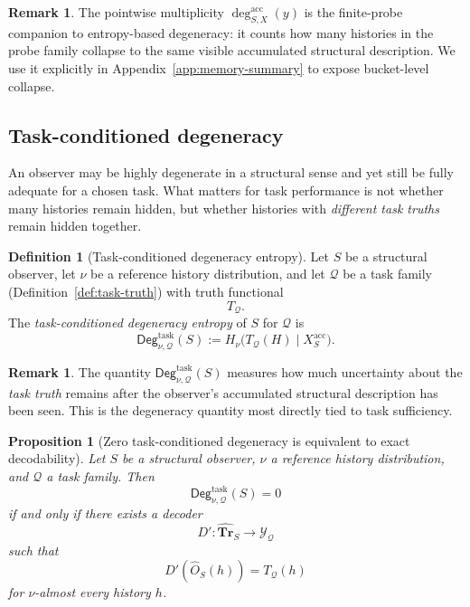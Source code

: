 \documentclass[11pt,twoside]{article}
\newtheorem{proposition}[theorem]{Proposition}
\theoremstyle{definition}
\newtheorem{definition}[theorem]{Definition}
\newtheorem{remark}[theorem]{Remark}
\newcommand{\Tr}{\mathbf{Tr}}
\newcommand{\acc}{\mathrm{acc}}
\newcommand{\task}{\mathrm{task}}
\begin{document}
\begin{remark}
\label{rem:pointwise-deg}
The pointwise multiplicity \(\deg^{\acc}_{S,X}(y)\) is the finite-probe companion to entropy-based degeneracy: it counts how many histories in the probe family collapse to the same visible accumulated structural description. We use it explicitly in Appendix~\ref{app:memory-summary} to expose bucket-level collapse.
\end{remark}

\subsection{Task-conditioned degeneracy}
\label{subsec:task-conditioned-degeneracy}

An observer may be highly degenerate in a structural sense and yet still be fully adequate for a chosen task. What matters for task performance is not whether many histories remain hidden, but whether histories with \emph{different task truths} remain hidden together.

\begin{definition}[Task-conditioned degeneracy entropy]
\label{def:task-conditioned-deg}
Let \(S\) be a structural observer, let \(\nu\) be a reference history distribution, and let \(\mathcal{Q}\) be a task family (Definition~\ref{def:task-truth}) with truth functional
\[
  T_{\mathcal{Q}}.
\]
The \emph{task-conditioned degeneracy entropy} of \(S\) for \(\mathcal{Q}\) is
\[
  \mathsf{Deg}^{\task}_{\nu,\mathcal{Q}}(S)
  :=
  H_\nu\!\bigl(T_{\mathcal{Q}}(H)\mid X_S^{\acc}\bigr).
\]
\end{definition}

\begin{remark}
\label{rem:task-conditioned-deg-intuition}
The quantity \(\mathsf{Deg}^{\task}_{\nu,\mathcal{Q}}(S)\) measures how much uncertainty about the \emph{task truth} remains after the observer's accumulated structural description has been seen. This is the degeneracy quantity most directly tied to task sufficiency.
\end{remark}

\begin{proposition}[Zero task-conditioned degeneracy is equivalent to exact decodability]
\label{prop:zero-task-deg-exact-decoding}
Let \(S\) be a structural observer, \(\nu\) a reference history distribution, and \(\mathcal{Q}\) a task family. Then
\[
  \mathsf{Deg}^{\task}_{\nu,\mathcal{Q}}(S)=0
\]
if and only if there exists a decoder
\[
  D' : \widehat{\Tr}_S \to \mathcal{Y}_{\mathcal{Q}}
\]
such that
\[
  D'(\widehat{O}_S(h)) = T_{\mathcal{Q}}(h)
\]
for \(\nu\)-almost every history \(h\).
\end{proposition}
\end{document}
